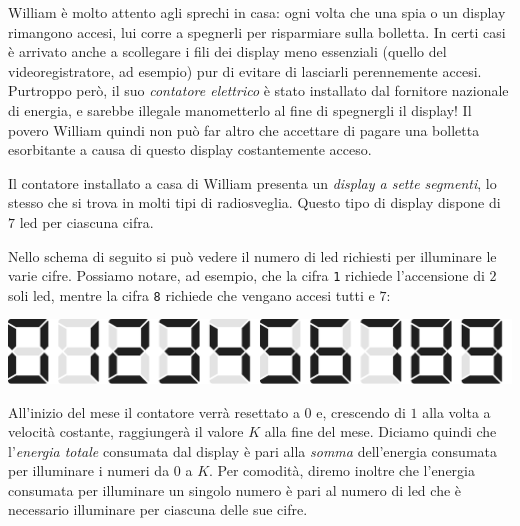 \usepackage{xcolor}
\usepackage{afterpage}
\usepackage{pifont,mdframed}
\usepackage[bottom]{footmisc}
\usepackage{multicol}

\makeatletter
\gdef\this@inputfilename{input.txt}
\gdef\this@outputfilename{output.txt}
\makeatother

\newcommand{\inputfile}{\texttt{input.txt}}
\newcommand{\outputfile}{\texttt{output.txt}}

\newenvironment{warning}
  {\par\begin{mdframed}[linewidth=2pt,linecolor=gray]%
    \begin{list}{}{\leftmargin=1cm
                   \labelwidth=\leftmargin}\item[\Large\ding{43}]}
  {\end{list}\end{mdframed}\par}

William è molto attento agli sprechi in casa: ogni volta che una spia o un display rimangono accesi, lui corre a spegnerli per risparmiare sulla bolletta. In certi casi è arrivato anche a scollegare i fili dei display meno essenziali (quello del videoregistratore, ad esempio) pur di evitare di lasciarli perennemente accesi. Purtroppo però, il suo \emph{contatore elettrico} è stato installato dal fornitore nazionale di energia, e sarebbe illegale manometterlo al fine di spegnergli il display! Il povero William quindi non può far altro che accettare di pagare una bolletta esorbitante a causa di questo display costantemente acceso.

Il contatore installato a casa di William presenta un \emph{display a sette segmenti}, lo stesso che si trova in molti tipi di radiosveglia. Questo tipo di display dispone di $7$ led per ciascuna cifra.

Nello schema di seguito si può vedere il numero di led richiesti per illuminare le varie cifre. Possiamo notare, ad esempio, che la cifra \texttt{1} richiede l'accensione di $2$ soli led, mentre la cifra \texttt{8} richiede che vengano accesi tutti e $7$:

\begin{center}
    \includegraphics[width=0.6\linewidth]{7led}
\end{center}

All'inizio del mese il contatore verrà resettato a $0$ e, crescendo di $1$ alla volta a velocità costante, raggiungerà il valore $K$ alla fine del mese. Diciamo quindi che l'\emph{energia totale} consumata dal display è pari alla \emph{somma} dell'energia consumata per illuminare i numeri da $0$ a $K$. Per comodità, diremo inoltre che l'energia consumata per illuminare un singolo numero è pari al numero di led che è necessario illuminare per ciascuna delle sue cifre.

